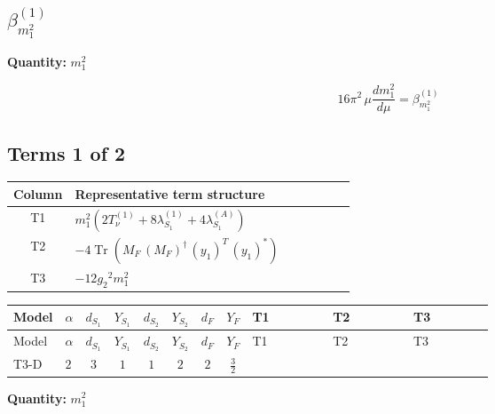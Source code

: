 \documentclass[8pt]{article}
\begin{document}
\begin{landscape}
\section*{$\beta_{m_1^2}^{(1)}$}
\noindent\textbf{Quantity: }$m_1^2$\par\smallskip
\[16\pi^2\,\mu\frac{d m_1^2}{d\mu}=\beta_{m_1^2}^{(1)}\]
\subsection*{Terms 1 of 2}
\begin{center}
\begin{tabular}{@{}c >{\raggedright\arraybackslash}p{0.82\linewidth}@{}}
\toprule
Column & Representative term structure \\
\midrule
T1 & \(\displaystyle {m_1^2} (2 T_{\nu}^{(1)}+8 {\lambda_{S_1}^{(1)}}+4 {\lambda_{S_1}^{(A)}})\) \\
\midrule
T2 & \(\displaystyle -4 \operatorname{Tr}\!\left({M_F}\,\left({M_F}\right)^{\dagger}\,\left({y_1}\right)^{T}\,\left({y_1}\right)^{*}\right)\) \\
\midrule
T3 & \(\displaystyle -12 {g_2}^2 {m_1^2}\) \\
\midrule
\bottomrule
\end{tabular}
\end{center}
\smallskip
\tiny
\begin{longtable}{@{}llcccccc >{\raggedright\arraybackslash}p{0.21\linewidth} >{\raggedright\arraybackslash}p{0.21\linewidth} >{\raggedright\arraybackslash}p{0.21\linewidth}@{}}
\toprule
Model & $\alpha$ & $d_{S_1}$ & $Y_{S_1}$ & $d_{S_2}$ & $Y_{S_2}$ & $d_F$ & $Y_F$ & T1 & T2 & T3 \\
\midrule
\endfirsthead
\toprule
Model & $\alpha$ & $d_{S_1}$ & $Y_{S_1}$ & $d_{S_2}$ & $Y_{S_2}$ & $d_F$ & $Y_F$ & T1 & T2 & T3 \\
\midrule
\endhead
T3-D & $2$ & $3$ & $1$ & $1$ & $2$ & $2$ & $\frac{3}{2}$ & \scriptsize\adjustbox{max width=\linewidth}{$\begin{gathered} {m_1^2} (2 T_{\nu}^{(1)}+8 {\lambda_{S_1}^{(1)}}+4 {\lambda_{S_1}^{(A)}})\end{gathered}$} & \scriptsize\adjustbox{max width=\linewidth}{$\begin{gathered} -4 \operatorname{Tr}\!\left({M_F}\,\left({M_F}\right)^{\dagger}\,\left({y_1}\right)^{T}\,\left({y_1}\right)^{*}\right)\end{gathered}$} & \scriptsize\adjustbox{max width=\linewidth}{$\begin{gathered} -12 {g_2}^2 {m_1^2}\end{gathered}$} \\
\midrule
\bottomrule
\end{longtable}
\clearpage
\noindent\textbf{Quantity: }$m_1^2$\par\smallskip

\end{landscape}
\end{document}

